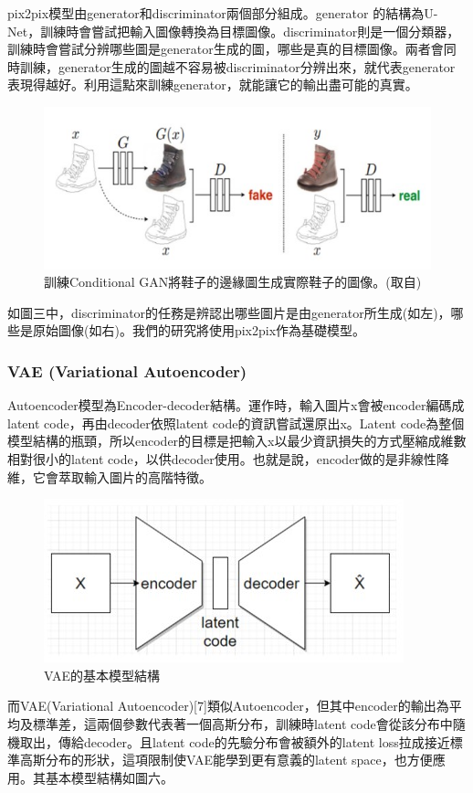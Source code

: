 \documentclass[a4paper, 12pt]{article}
\begin{document}
pix2pix模型由generator和discriminator兩個部分組成。generator 的結構為U-Net，訓練時會嘗試把輸入圖像轉換為目標圖像。discriminator則是一個分類器，訓練時會嘗試分辨哪些圖是generator生成的圖，哪些是真的目標圖像。兩者會同時訓練，generator生成的圖越不容易被discriminator分辨出來，就代表generator表現得越好。利用這點來訓練generator，就能讓它的輸出盡可能的真實。

\begin{figure}[H]
    \centering
    \includegraphics[width=0.6\linewidth]{fig/3.jpg}
    \caption{訓練Conditional GAN將鞋子的邊緣圖生成實際鞋子的圖像。(取自\cite{isola2017image})}
    \label{fig:3}
\end{figure}

如圖三中，discriminator的任務是辨認出哪些圖片是由generator所生成(如左)，哪些是原始圖像(如右)。我們的研究將使用pix2pix作為基礎模型。

\subsubsection{VAE (Variational Autoencoder)}
Autoencoder模型為Encoder-decoder結構。運作時，輸入圖片x會被encoder編碼成latent code，再由decoder依照latent code的資訊嘗試還原出x。Latent code為整個模型結構的瓶頸，所以encoder的目標是把輸入x以最少資訊損失的方式壓縮成維數相對很小的latent code，以供decoder使用。也就是說，encoder做的是非線性降維，它會萃取輸入圖片的高階特徵。


\begin{figure}[H]
    \centering
    \includegraphics[width=0.5\linewidth]{fig/4.jpg}
    \caption{VAE的基本模型結構}
    \label{fig:4}
\end{figure}

而VAE(Variational Autoencoder)[7]類似Autoencoder，但其中encoder的輸出為平均及標準差，這兩個參數代表著一個高斯分布，訓練時latent code會從該分布中隨機取出，傳給decoder。且latent code的先驗分布會被額外的latent loss拉成接近標準高斯分布的形狀，這項限制使VAE能學到更有意義的latent space，也方便應用。其基本模型結構如圖六。
\end{document}
